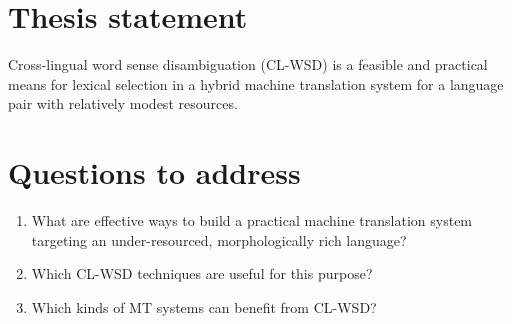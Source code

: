 
\section{Thesis statement}
Cross-lingual word sense disambiguation (CL-WSD) is a feasible and practical
means for lexical selection in a hybrid machine translation system for a
language pair with relatively modest resources.

\section{Questions to address}
\begin{enumerate}
\item What are effective ways to build a practical machine translation system
targeting an under-resourced, morphologically rich language?
\item Which CL-WSD techniques are useful for this purpose?
\item Which kinds of MT systems can benefit from CL-WSD?
\end{enumerate}
